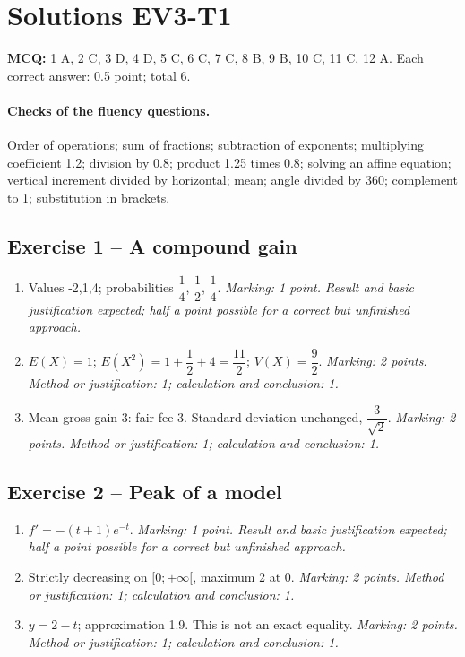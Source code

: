 \clearpage\section*{Solutions EV3-T1}\label{EV3-T1-CORR}
\textbf{MCQ:} 1 A, 2 C, 3 D, 4 D, 5 C, 6 C, 7 C, 8 B, 9 B, 10 C, 11 C, 12 A. Each correct answer: 0.5 point; total 6.
\paragraph{Checks of the fluency questions.} Order of operations; sum of fractions; subtraction of exponents; multiplying coefficient 1.2; division by 0.8; product 1.25 times 0.8; solving an affine equation; vertical increment divided by horizontal; mean; angle divided by 360; complement to 1; substitution in brackets.
\subsection*{Exercise 1 -- A compound gain}
\begin{enumerate}
\item Values -2,1,4; probabilities $\dfrac{1}{4}$, $\dfrac{1}{2}$, $\dfrac{1}{4}$. \textit{Marking: 1 point. Result and basic justification expected; half a point possible for a correct but unfinished approach.}
\item $E(X)=1$; $E(X^2)=1+\dfrac{1}{2}+4=\dfrac{11}{2}$; $V(X)=\dfrac{9}{2}$. \textit{Marking: 2 points. Method or justification: 1; calculation and conclusion: 1.}
\item Mean gross gain 3: fair fee 3. Standard deviation unchanged, $\dfrac{3}{\sqrt 2}$. \textit{Marking: 2 points. Method or justification: 1; calculation and conclusion: 1.}
\end{enumerate}
\subsection*{Exercise 2 -- Peak of a model}
\begin{enumerate}
\item $f\prime=-(t+1)e^{-t}$. \textit{Marking: 1 point. Result and basic justification expected; half a point possible for a correct but unfinished approach.}
\item Strictly decreasing on $[0;+\infty[$, maximum 2 at 0. \textit{Marking: 2 points. Method or justification: 1; calculation and conclusion: 1.}
\item $y=2-t$; approximation 1.9. This is not an exact equality. \textit{Marking: 2 points. Method or justification: 1; calculation and conclusion: 1.}
\end{enumerate}
